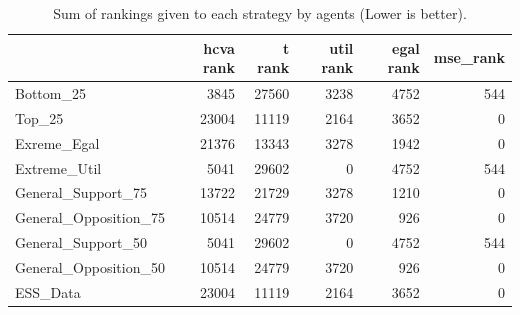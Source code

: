 \begin{table}
\caption{Sum of rankings given to each strategy by agents (Lower is better).}
\begin{tabular}{lrrrrr}
\toprule
 & hcva rank & t rank & util rank & egal rank & mse_rank \\
\midrule
Bottom_25 & 3845 & 27560 & 3238 & 4752 & 544 \\
Top_25 & 23004 & 11119 & 2164 & 3652 & 0 \\
Exreme_Egal & 21376 & 13343 & 3278 & 1942 & 0 \\
Extreme_Util & 5041 & 29602 & 0 & 4752 & 544 \\
General_Support_75 & 13722 & 21729 & 3278 & 1210 & 0 \\
General_Opposition_75 & 10514 & 24779 & 3720 & 926 & 0 \\
General_Support_50 & 5041 & 29602 & 0 & 4752 & 544 \\
General_Opposition_50 & 10514 & 24779 & 3720 & 926 & 0 \\
ESS_Data & 23004 & 11119 & 2164 & 3652 & 0 \\
\bottomrule
\end{tabular}
\end{table}
